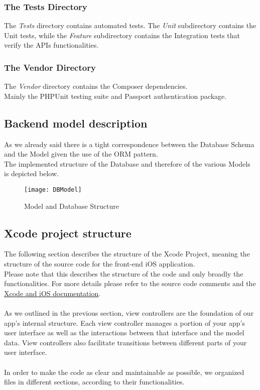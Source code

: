\subsubsection*{The Tests Directory}
The \textit{Tests} directory contains automated tests. The \textit{Unit} subdirectory contains the Unit tests, while the \textit{Feature} subdirectory contains the Integration tests that verify the APIs functionalities.

\subsubsection*{The Vendor Directory}
The \textit{Vendor} directory contains the Composer dependencies.\\
Mainly the PHPUnit testing suite and Passport authentication package.

\subsection{Backend model description}
\label{dbmodel}
As we already said there is a tight correspondence between the Database Schema and the Model given the use of the ORM pattern.\\
The implemented structure of the Database and therefore of the various Models is depicted below.

\begin{figure}[H]
	\centering
	\texttt{[image: DBModel]}
	\caption{Model and Database Structure}
\end{figure}

\subsection{Xcode project structure}
The following section describes the structure of the Xcode Project, meaning the structure of the source code for the front-end iOS application.\\
Please note that this describes the structure of the code and only broadly the functionalities. For more details please refer to the source code comments and the \href{https://developer.apple.com/documentation/}{Xcode and iOS documentation}.
\\ \\
As we outlined in the previous section, view controllers are the foundation of our app’s internal structure. Each view controller manages a portion of your app’s user interface as well as the interactions between that interface and the model data. View controllers also facilitate transitions between different parts of your user interface. 
\\ \\
In order to make the code as clear and maintainable as possible, we organized files in different sections, according to their functionalities.

